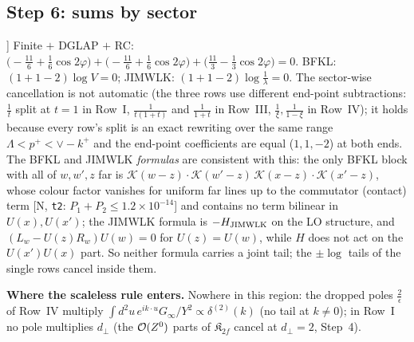 \subsection{Step 6: sums by sector}
\noindent [A, \texttt{t3} [5]] Finite $+$ DGLAP $+$ RC: $\big(-\frac{11}{6}+\frac16\cos2\varphi\big)+\big(-\frac{11}{6}+\frac16\cos2\varphi\big)+\big(\frac{11}{3}-\frac13\cos2\varphi\big)=0$. BFKL: $(1+1-2)\log V=0$; JIMWLK: $(1+1-2)\log\frac1\lambda=0$. The sector-wise cancellation is not automatic (the three rows use different end-point subtractions: $\frac{1}{t}$ split at $t=1$ in Row~I, $\frac{1}{t(1+t)}$ and $\frac{1}{1+t}$ in Row~III, $\frac{1}{\xi},\frac{1}{1-\xi}$ in Row~IV); it holds because every row's split is an exact rewriting over the same range $\Lambda<p^{+}<\vee-k^{+}$ and the end-point coefficients are equal ($1,1,-2$) at both ends. The BFKL and JIMWLK \emph{formulas} are consistent with this: the only BFKL block with all of $w,w',z$ far is $\mathcal{K}(w-z)\cdot\mathcal{K}(w'-z)\,\mathcal{K}(x-z)\cdot\mathcal{K}(x'-z)$, whose colour factor vanishes for uniform far lines up to the commutator (contact) term [N, \texttt{t2}: $P_{1}+P_{2}\le1.2\times10^{-14}$] and contains no term bilinear in $U(x),U(x')$; the JIMWLK formula is $-H_{\rm JIMWLK}$ on the LO structure, and $(L_{w}-U(z)R_{w})U(w)=0$ for $U(z)=U(w)$, while $H$ does not act on the $U(x')U(x)$ part. So neither formula carries a joint tail; the $\pm\log$ tails of the single rows cancel inside them.

\noindent\textbf{Where the scaleless rule enters.} Nowhere in this region: the dropped poles $\frac{2}{\epsilon}$ of Row~IV multiply $\int d^{2}u\,e^{ik\cdot u}G_{\infty}/Y^{2}\propto\delta^{(2)}(k)$ (no tail at $k\ne0$); in Row~I no pole multiplies $d_{\perp}$ (the ${\cal O}(Z^{0})$ parts of $\mathfrak{K}_{2f}$ cancel at $d_{\perp}=2$, Step~4).


